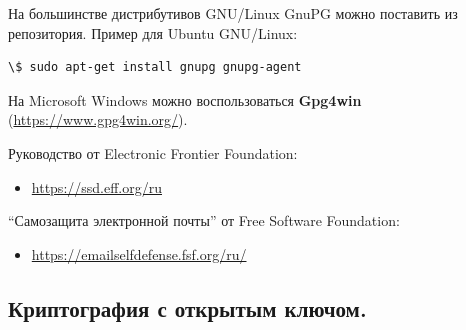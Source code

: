 \documentclass[presentation]{beamer}
\newcommand{\RaisedRightHand}{%
  \raisebox{-.50em}{\Large\HandRight}
}
\begin{document}
\begin{frame}[fragile]{}
  На большинстве дистрибутивов GNU/Linux GnuPG можно поставить из
  репозитория.  Пример для Ubuntu GNU/Linux:
\begin{Verbatim}[commandchars=\\\[\]]
\$ sudo apt-get install gnupg gnupg-agent
\end{Verbatim}
\vspace{5 mm}

На Microsoft Windows можно воспользоваться \textbf{Gpg4win}
(\url{https://www.gpg4win.org/}).\newline

\RaisedRightHand Руководство от Electronic Frontier Foundation:
\begin{itemize}
\item \url{https://ssd.eff.org/ru}
\end{itemize}
\RaisedRightHand ``Самозащита электронной почты'' от Free Software
Foundation:
\begin{itemize}
\item \url{https://emailselfdefense.fsf.org/ru/}
\end{itemize}
\end{frame}



\subsection{Криптография с открытым ключом.}
\end{document}
